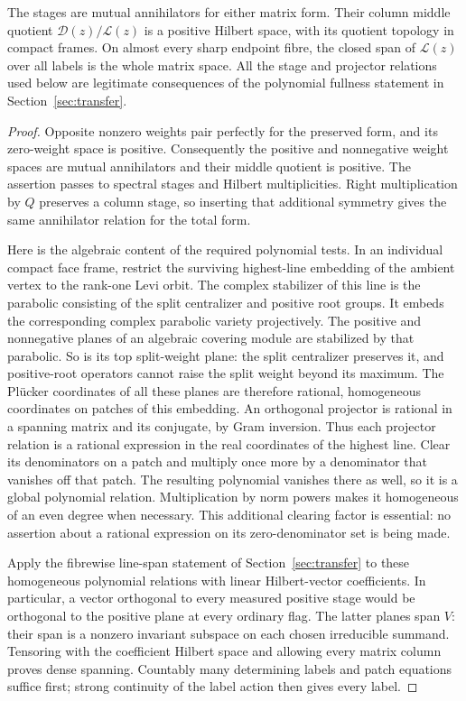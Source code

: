\begin{lemma}\label{lem:panels-stages}
The stages are mutual annihilators for either matrix form.  Their column
middle quotient $\mathcal D(z)/\mathcal L(z)$ is a positive Hilbert
space, with its quotient topology in compact frames.  On almost every
sharp endpoint fibre, the closed span of $\mathcal L(z)$ over all labels
is the whole matrix space.  All the stage and projector relations used
below are legitimate consequences of the polynomial fullness statement
in Section~\ref{sec:transfer}.
\end{lemma}

\begin{proof}
Opposite nonzero weights pair perfectly for the preserved form, and its
zero-weight space is positive.  Consequently the positive and
nonnegative weight spaces are mutual annihilators and their middle
quotient is positive.  The assertion passes to spectral stages and
Hilbert multiplicities.  Right multiplication by $Q$ preserves a
column stage, so inserting that additional symmetry gives the same
annihilator relation for the total form.

Here is the algebraic content of the required polynomial tests.  In an
individual compact face frame, restrict the surviving highest-line
embedding of the ambient vertex to the rank-one Levi orbit.  The complex
stabilizer of this line is the parabolic consisting of the split
centralizer and positive root groups.  It embeds the corresponding
complex parabolic variety projectively.  The positive and nonnegative
planes of an algebraic covering module are stabilized by that parabolic.
So is its top split-weight plane: the split centralizer preserves it, and
positive-root operators cannot raise the split weight beyond its maximum.
The Pl\"ucker coordinates of all these planes are therefore rational,
homogeneous coordinates on patches of this embedding.  An orthogonal projector is
rational in a spanning matrix and its conjugate, by Gram inversion.
Thus each projector relation is a rational expression in the real
coordinates of the highest line.  Clear its denominators on a patch and
multiply once more by a denominator that vanishes off that patch.  The
resulting polynomial vanishes there as well, so it is a global polynomial
relation.  Multiplication by norm powers makes it homogeneous of an even
degree when necessary.  This additional clearing factor is essential:
no assertion about a rational expression on its zero-denominator set is
being made.

Apply the fibrewise line-span statement of
Section~\ref{sec:transfer} to these homogeneous polynomial relations
with linear Hilbert-vector coefficients.  In particular, a vector
orthogonal to every measured positive stage would be orthogonal to the
positive plane at every ordinary flag.  The latter planes span $V$: their
span is a nonzero invariant subspace on each chosen irreducible summand.
Tensoring with the coefficient Hilbert space and allowing every matrix
column proves dense spanning.  Countably many determining labels and
patch equations suffice first; strong continuity of the label action
then gives every label.
\end{proof}


